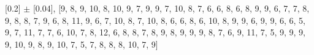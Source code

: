 
[0.2] $\pm$ [0.04], [9, 8, 9, 10, 8, 10, 9, 7, 9, 9, 7, 10, 8, 7, 6, 6, 8, 6, 8, 9, 9, 6, 7, 7, 8, 9, 8, 8, 7, 9, 6, 8, 11, 9, 6, 7, 10, 8, 7, 10, 8, 6, 6, 8, 6, 10, 8, 9, 9, 6, 9, 9, 6, 6, 5, 9, 7, 11, 7, 7, 6, 10, 7, 8, 12, 6, 8, 8, 7, 8, 9, 8, 9, 9, 9, 8, 7, 6, 9, 11, 7, 5, 9, 9, 9, 9, 10, 9, 8, 9, 10, 7, 5, 7, 8, 8, 8, 10, 7, 9]\\
    